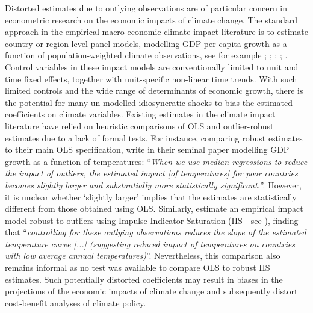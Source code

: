 \documentclass[11pt, letterpaper]{article}
\numberwithin{algorithm}{section}
\numberwithin{assumption}{section}
\numberwithin{lemma}{section}
\numberwithin{theorem}{section}
\numberwithin{corollary}{section}
\numberwithin{remark}{section}
\numberwithin{equation}{section}
\numberwithin{figure}{section}
\numberwithin{table}{section}
\providecommand{\DIFdel}[1]{{\protect\color{red}\sout{#1}}}                      %
\providecommand{\DIFdelbegin}{} %
\providecommand{\DIFdelend}{} %
\newcommand{\DIFscaledelfig}{0.5}
\newlength{\DIFdelgraphicswidth} %
\newlength{\DIFdelgraphicsheight} %
\newcommand{\DIFdelincludegraphics}[2][]{%
\sbox{\DIFdelgraphicsbox}{\DIFOincludegraphics[#1]{#2}}%
\settoboxwidth{\DIFdelgraphicswidth}{\DIFdelgraphicsbox} %
\settoboxtotalheight{\DIFdelgraphicsheight}{\DIFdelgraphicsbox} %
\scalebox{\DIFscaledelfig}{%
\parbox[b]{\DIFdelgraphicswidth}{\usebox{\DIFdelgraphicsbox}\\[-\baselineskip] \rule{\DIFdelgraphicswidth}{0em}}\llap{\resizebox{\DIFdelgraphicswidth}{\DIFdelgraphicsheight}{%
\setlength{\unitlength}{\DIFdelgraphicswidth}%
\begin{picture}(1,1)%
\thicklines\linethickness{2pt} %
{\color[rgb]{1,0,0}\put(0,0){\framebox(1,1){}}}%
{\color[rgb]{1,0,0}\put(0,0){\line( 1,1){1}}}%
{\color[rgb]{1,0,0}\put(0,1){\line(1,-1){1}}}%
\end{picture}%
}\hspace*{3pt}}} %
} %
\DeclareRobustCommand{\DIFdelbegin}{\DIFOdelbegin \let\includegraphics\DIFdelincludegraphics} %
\DeclareRobustCommand{\DIFdelend}{\DIFOaddend \let\includegraphics\DIFOincludegraphics} %
\begin{document}
Distorted estimates due to outlying observations are of particular concern in econometric research on the economic impacts of climate change. The standard approach in the empirical macro-economic climate-impact literature is to estimate country or region-level panel models, modelling GDP per capita growth as a function of population-weighted climate observations, see for example \cite{dell2012temperature}; \cite{burke2015global}; \cite{pretis2018uncertain}; \cite{kalkuhl2020impact}; \cite{newell2021gdp}. Control variables in these impact models are conventionally limited to unit and time fixed effects, together with unit-specific non-linear time trends. With such limited controls and the wide range of determinants of economic growth, there is the potential for many un-modelled idiosyncratic shocks to bias the estimated coefficients on climate variables. Existing estimates in the climate impact literature have relied on heuristic comparisons of OLS and outlier-robust estimates due to a lack of formal tests. For instance, comparing robust estimates to their main OLS specification, \cite{dell2012temperature} write in their seminal paper modelling GDP growth as a function of temperatures: ``\emph{When we use median regressions to reduce the impact of outliers, the estimated impact [of temperatures] for poor countries becomes slightly larger and substantially more statistically significant\DIFdelbegin \DIFdel{.}\DIFdelend }''. However, it is unclear whether `slightly larger' implies that the estimates are statistically different from those obtained using OLS. Similarly, \cite{pretis2018uncertain} estimate an empirical impact model robust to outliers using Impulse Indicator Saturation (IIS - see \citealt{hendry2008automatic}), finding that ``\emph{controlling for these outlying observations reduces the slope of the estimated temperature curve [...] (suggesting reduced impact of temperatures on countries with low average annual temperatures)}''. Nevertheless, this comparison also remains informal as no test was available to compare OLS to robust IIS estimates. Such potentially distorted coefficients may result in biases in the projections of the economic impacts of climate change and subsequently distort cost-benefit analyses of climate policy.
\end{document}
